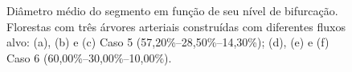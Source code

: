 \clearpage

\begin{figure}[!htb]
  \centering
  \captiondelim{: }
  \caption{Diâmetro médio do segmento em função de seu nível de bifurcação. 
  Florestas com três árvores arteriais construídas com diferentes fluxos alvo: 
  (a), (b) e (c) Caso 5 (57,20\%--28,50\%--14,30\%);  (d), (e) e (f) Caso 6 (60,00\%--30,00\%--10,00\%).}
  
  \hspace{12pt}


\end{figure}
